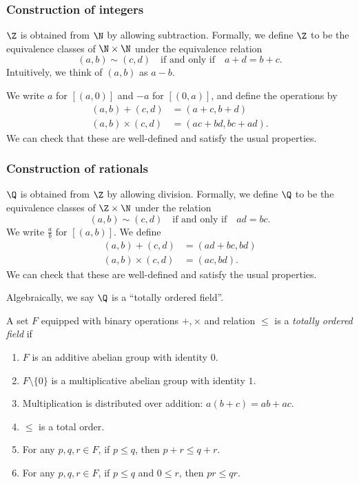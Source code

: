 \documentclass[a4paper]{article}
\begin{document}
\subsubsection*{Construction of integers}
\begin{defi}[Integers]
  $\Z$ is obtained from $\N$ by allowing subtraction. Formally, we define $\Z$ to be the equivalence classes of $\N\times \N$ under the equivalence relation
  \[
    (a, b) \sim (c, d) \quad\text{if and only if}\quad a + d = b + c.
  \]
  Intuitively, we think of $(a, b)$ as $a - b$.

  We write $a$ for $[(a, 0)]$ and $-a$ for $[(0, a)]$, and define the operations by
  \begin{align*}
    (a, b) + (c, d) &= (a + c, b + d)\\
    (a, b)\times (c, d) &= (ac + bd, bc + ad).
  \end{align*}
  We can check that these are well-defined and satisfy the usual properties.
\end{defi}

\subsubsection*{Construction of rationals}
\begin{defi}[Rationals]
  $\Q$ is obtained from $\Z$ by allowing division. Formally, we define $\Q$ to be the equivalence classes of $\Z \times \N$ under the relation
  \[
    (a, b) \sim (c, d)\quad\text{if and only if}\quad ad = bc.
  \]
  We write $\frac{a}{b}$ for $[(a, b)]$. We define
  \begin{align*}
   (a, b) + (c, d) &= (ad + bc, bd)\\
   (a, b)\times (c, d) &= (ac, bd).
  \end{align*}
  We can check that these are well-defined and satisfy the usual properties.
\end{defi}

Algebraically, we say $\Q$ is a ``totally ordered field''.
\begin{defi}
  A set $F$ equipped with binary operations $+, \times$ and relation $\leq$ is a \emph{totally ordered field} if
  \begin{enumerate}
    \item $F$ is an additive abelian group with identity $0$.
    \item $F\setminus \{0\}$ is a multiplicative abelian group with identity $1$.
    \item Multiplication is distributed over addition: $a(b + c) = ab + ac$.
    \item $\leq$ is a total order.
    \item For any $p, q, r \in F$, if $p \leq q$, then $p + r \leq q+ r$.
    \item For any $p, q, r \in F$, if $p \leq q$ and $0 \leq r$, then $p r \leq qr$.
  \end{enumerate}
\end{defi}
\end{document}
